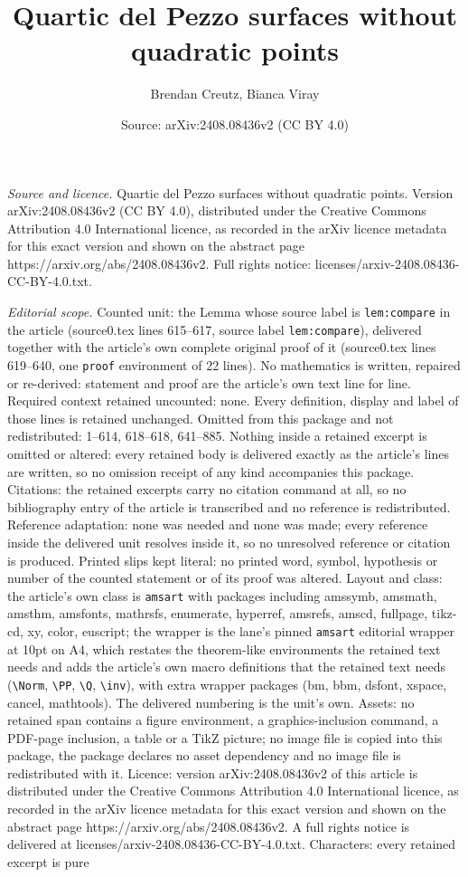 \documentclass[10pt,a4paper]{amsart}
\title[Quartic del Pezzo surfaces without quadratic points]{Quartic del Pezzo surfaces without quadratic points}
\author{Brendan Creutz, Bianca Viray}
\date{Source: arXiv:2408.08436v2 (CC BY 4.0)}
\begin{document}
\maketitle

\noindent\emph{Source and licence.} Quartic del Pezzo surfaces without quadratic points. Version arXiv:2408.08436v2 (CC BY 4.0), distributed under the Creative Commons Attribution 4.0 International licence, as recorded in the arXiv licence metadata for this exact version and shown on the abstract page https://arxiv.org/abs/2408.08436v2. Full rights notice: licenses/arxiv-2408.08436-CC-BY-4.0.txt.\par\smallskip

\noindent\textit{Editorial scope.} Counted unit: the Lemma whose source label is \texttt{lem:compare} in the article (source0.tex lines 615--617, source label \texttt{lem:compare}), delivered together with the article's own complete original proof of it (source0.tex lines 619--640, one \texttt{proof} environment of 22 lines). No mathematics is written, repaired or re-derived: statement and proof are the article's own text line for line. Required context retained uncounted: none. Every definition, display and label of those lines is retained unchanged. Omitted from this package and not redistributed: 1--614, 618--618, 641--885. Nothing inside a retained excerpt is omitted or altered: every retained body is delivered exactly as the article's lines are written, so no omission receipt of any kind accompanies this package. Citations: the retained excerpts carry no citation command at all, so no bibliography entry of the article is transcribed and no reference is redistributed. Reference adaptation: none was needed and none was made; every reference inside the delivered unit resolves inside it, so no unresolved reference or citation is produced. Printed slips kept literal: no printed word, symbol, hypothesis or number of the counted statement or of its proof was altered. Layout and class: the article's own class is \texttt{amsart} with packages including amssymb, amsmath, amsthm, amsfonts, mathrsfs, enumerate, hyperref, amsrefs, amscd, fullpage, tikz-cd, xy, color, euscript; the wrapper is the lane's pinned \texttt{amsart} editorial wrapper at 10pt on A4, which restates the theorem-like environments the retained text needs and adds the article's own macro definitions that the retained text needs (\texttt{\textbackslash Norm}, \texttt{\textbackslash PP}, \texttt{\textbackslash Q}, \texttt{\textbackslash inv}), with extra wrapper packages (bm, bbm, dsfont, xspace, cancel, mathtools). The delivered numbering is the unit's own. Assets: no retained span contains a figure environment, a graphics-inclusion command, a PDF-page inclusion, a table or a TikZ picture; no image file is copied into this package, the package declares no asset dependency and no image file is redistributed with it. Licence: version arXiv:2408.08436v2 of this article is distributed under the Creative Commons Attribution 4.0 International licence, as recorded in the arXiv licence metadata for this exact version and shown on the abstract page https://arxiv.org/abs/2408.08436v2. A full rights notice is delivered at licenses/arxiv-2408.08436-CC-BY-4.0.txt. Characters: every retained excerpt is pure 
\end{document}
